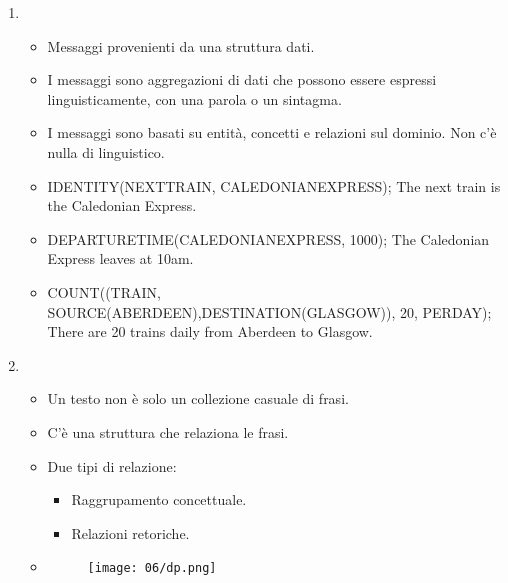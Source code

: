 \begin{enumerate}
  \item {} 
    \begin{itemize}
      \item Messaggi provenienti da una struttura dati. 
      \item I messaggi sono aggregazioni di dati che possono essere espressi linguisticamente, con una parola o un sintagma. 
      \item I messaggi sono basati su entità, concetti e relazioni sul dominio. Non c'è nulla di linguistico.  
      \item {} IDENTITY(NEXTTRAIN, CALEDONIANEXPRESS); The next train is the Caledonian Express.
      \item {} DEPARTURETIME(CALEDONIANEXPRESS, 1000); The Caledonian Express leaves at 10am. 
      \item {} COUNT((TRAIN, SOURCE(ABERDEEN),DESTINATION(GLASGOW)), 20, PERDAY); There are 20 trains daily from Aberdeen to Glasgow.
    \end{itemize}
  \item {}
    \begin{itemize}
      \item Un testo non è solo un collezione casuale di frasi. 
      \item C'è una struttura che relaziona le frasi. 
      \item Due tipi di relazione:
        \begin{itemize}
          \item Raggrupamento concettuale. 
          \item Relazioni retoriche.
        \end{itemize}
      \item {}
\begin{figure}[h]
    \centering
    \texttt{[image: 06/dp.png]}
\end{figure}


\end{itemize}
\end{enumerate}
